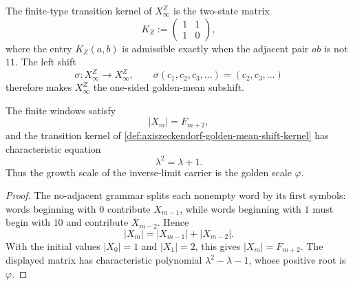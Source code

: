 \begin{definition}
\label{def:axiszeckendorf-golden-mean-shift-kernel}
The finite-type transition kernel of $X_\infty^Z$ is the two-state matrix
$$
K_Z
:=
\begin{pmatrix}
1&1\\
1&0
\end{pmatrix},
$$
where the entry $K_Z(a,b)$ is admissible exactly when the adjacent pair
$ab$ is not $11$.  The left shift
$$
\sigma:X_\infty^Z\to X_\infty^Z,
\qquad
\sigma(c_1,c_2,c_3,\ldots)=(c_2,c_3,\ldots)
$$
therefore makes $X_\infty^Z$ the one-sided golden-mean subshift.
\end{definition}

\begin{proposition}
\label{prop:axiszeckendorf-golden-growth-finite-windows}
The finite windows satisfy
$$
|X_m|=F_{m+2},
$$
and the transition kernel of
\autoref{def:axiszeckendorf-golden-mean-shift-kernel} has characteristic
equation
$$
\lambda^2=\lambda+1.
$$
Thus the growth scale of the inverse-limit carrier is the golden scale
$\varphi$.
\end{proposition}

\begin{proof}
The no-adjacent grammar splits each nonempty word by its first symbols:
words beginning with $0$ contribute $X_{m-1}$, while words beginning with
$1$ must begin with $10$ and contribute $X_{m-2}$.  Hence
$$
|X_m|=|X_{m-1}|+|X_{m-2}|.
$$
With the initial values $|X_0|=1$ and $|X_1|=2$, this gives
$|X_m|=F_{m+2}$.  The displayed matrix has characteristic polynomial
$\lambda^2-\lambda-1$, whose positive root is $\varphi$.
\end{proof}

